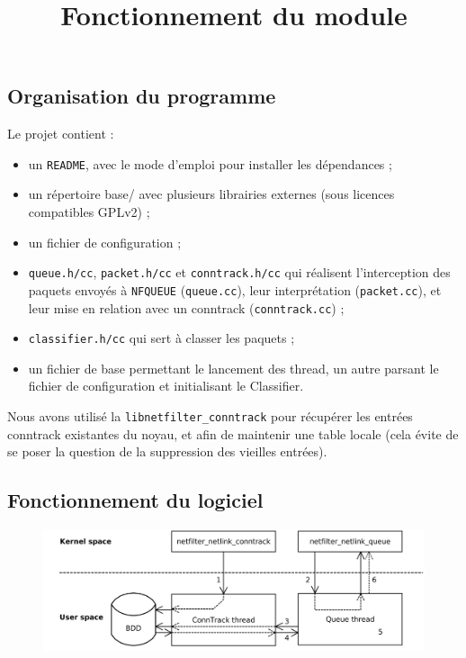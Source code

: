 \subsection{Organisation du programme}
Le projet contient :
\begin{itemize}
\item un \verb+README+, avec le mode d'emploi pour installer les dépendances ;
\item un répertoire base/ avec plusieurs librairies externes (sous
licences compatibles GPLv2) ;
\item un fichier de configuration ;
\item \verb+queue.h/cc+, \verb+packet.h/cc+ et \verb+conntrack.h/cc+ qui réalisent l'interception des paquets envoyés à \verb+NFQUEUE+ (\verb+queue.cc+), leur
interprétation (\verb+packet.cc+), et leur mise en relation avec un conntrack
(\verb+conntrack.cc+) ;
\item \verb+classifier.h/cc+ qui sert à classer les paquets ;
\item un fichier de base permettant le lancement des thread, un autre parsant le fichier de configuration et initialisant le Classifier.
\end{itemize}

Nous avons utilisé la \verb+libnetfilter_conntrack+ pour
récupérer les entrées conntrack existantes du noyau, et afin de maintenir une table locale (cela évite de se poser la question de
la suppression des vieilles entrées).

\subsection{Fonctionnement du logiciel}

\begin{figure}[h]
\centering
\includegraphics[width=\textwidth]{report/schema2.png}\\
\title{Fonctionnement du module}
\end{figure}


